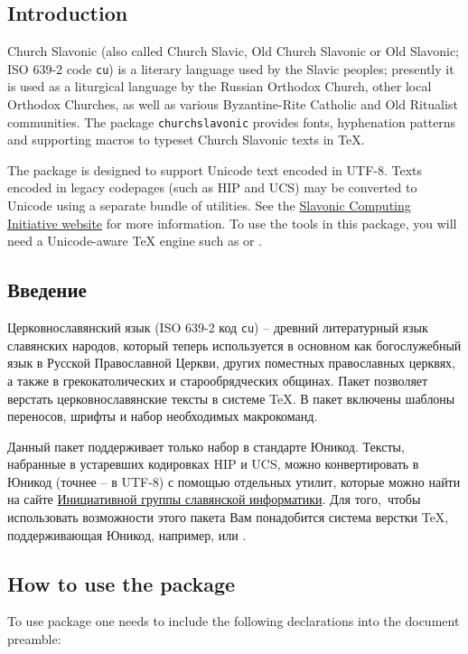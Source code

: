 \tableofcontents

\begin{EN}
\section*{Introduction}
Church Slavonic (also called Church Slavic, Old Church Slavonic
or Old Slavonic; ISO 639-2 code \texttt{cu}) is a literary language used by
the Slavic peoples; presently it is used as a liturgical language by the
Russian Orthodox Church, other local Orthodox Churches, as well
as various Byzantine-Rite Catholic and Old Ritualist communities.
The package \texttt{churchslavonic} provides fonts, hyphenation
patterns and supporting macros to typeset
Church Slavonic texts in \TeX{}.

The package is designed to support Unicode text encoded in UTF-8.
Texts encoded in legacy codepages (such as HIP and UCS) may be
converted to Unicode using a separate bundle of utilities.
See the \href{http://sci.ponomar.net/}
{Slavonic Computing Initiative website} for more information.
To use the tools in this package, you will need a Unicode-aware \TeX{}
engine such as \XeTeX{} or \LuaTeX{}.
\end{EN}

\begin{RU}
\section*{Введение}
Церковнославянский язык (ISO 639-2 код \texttt{cu}) --
древний литературный язык славянских народов,
который теперь используется в основном как богослужебный язык
в Русской Православной Церкви, других поместных православных
церквях, а также в грекокатолических и старообрядческих общинах.
Пакет  позволяет верстать церковнославянские тексты
в системе \TeX{}. В пакет включены шаблоны переносов,
шрифты и набор необходимых макрокоманд.

Данный пакет поддерживает только набор в стандарте Юникод.
Тексты, набранные в устаревших кодировках HIP и UCS,
можно конвертировать в Юникод (точнее -- в UTF-8) с помощью
отдельных утилит, которые можно найти на сайте
\href{http://sci.ponomar.net/}
{Инициативной группы славянской информатики}.
Для того, чтобы использовать возможности этого пакета Вам
понадобится система верстки \TeX{}, поддерживающая Юникод,
например, \XeTeX{} или \LuaTeX{}.
\end{RU}

\begin{EN}
\section{How to use the package}
To use  package one needs to include the following declarations into the document
preamble:
\end{EN}

